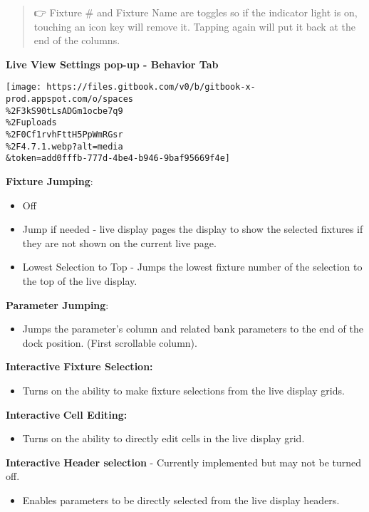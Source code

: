 \documentclass[
]{article}
\providecommand{\tightlist}{%
  \setlength{\itemsep}{0pt}\setlength{\parskip}{0pt}}
\begin{document}
\begin{quote}
👉 {Fixture \# and Fixture Name are toggles so if the indicator light is on, touching an icon key will remove it. Tapping again will put it back at the end of the columns.}
\end{quote}

\textbf{Live View Settings pop-up - Behavior Tab}

\texttt{[image: https://files.gitbook.com/v0/b/gitbook-x-prod.appspot.com/o/spaces\\\%2F3kS90tLsADGm1ocbe7q9\\\%2Fuploads\\\%2F0Cf1rvhFttH5PpWmRGsr\\\%2F4.7.1.webp?alt=media\\\&token=add0fffb-777d-4be4-b946-9baf95669f4e]}

\textbf{Fixture Jumping}:

\begin{itemize}
\tightlist
\item
  Off
\item
  Jump if needed - live display pages the display to show the selected fixtures if they are not shown on the current live page.
\item
  Lowest Selection to Top - Jumps the lowest fixture number of the selection to the top of the live display.
\end{itemize}

\textbf{Parameter Jumping}:

\begin{itemize}
\tightlist
\item
  Jumps the parameter's column and related bank parameters to the end of the dock position. (First scrollable column).
\end{itemize}

{\textbf{Interactive Fixture Selection:}}

\begin{itemize}
\tightlist
\item
  {Turns on the ability to make fixture selections from the live display grids.}
\end{itemize}

{\textbf{Interactive} \textbf{Cell Editing:}}

\begin{itemize}
\tightlist
\item
  {Turns on the ability to directly edit cells in the live display grid.}
\end{itemize}

\textbf{Interactive Header selection} - Currently implemented but may not be turned off.

\begin{itemize}
\tightlist
\item
  {Enables parameters to be directly selected from the live display headers.}
\end{itemize}
\end{document}
